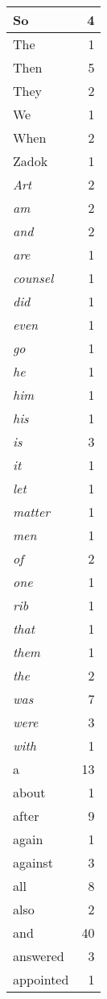 \begin{center}
\begin{longtable}{l|r}
So & 4 \\ \hline
The & 1 \\ \hline
Then & 5 \\ \hline
They & 2 \\ \hline
We & 1 \\ \hline
When & 2 \\ \hline
Zadok & 1 \\ \hline
\emph{Art} & 2 \\ \hline
\emph{am} & 2 \\ \hline
\emph{and} & 2 \\ \hline
\emph{are} & 1 \\ \hline
\emph{counsel} & 1 \\ \hline
\emph{did} & 1 \\ \hline
\emph{even} & 1 \\ \hline
\emph{go} & 1 \\ \hline
\emph{he} & 1 \\ \hline
\emph{him} & 1 \\ \hline
\emph{his} & 1 \\ \hline
\emph{is} & 3 \\ \hline
\emph{it} & 1 \\ \hline
\emph{let} & 1 \\ \hline
\emph{matter} & 1 \\ \hline
\emph{men} & 1 \\ \hline
\emph{of} & 2 \\ \hline
\emph{one} & 1 \\ \hline
\emph{rib} & 1 \\ \hline
\emph{that} & 1 \\ \hline
\emph{them} & 1 \\ \hline
\emph{the} & 2 \\ \hline
\emph{was} & 7 \\ \hline
\emph{were} & 3 \\ \hline
\emph{with} & 1 \\ \hline
a & 13 \\ \hline
about & 1 \\ \hline
after & 9 \\ \hline
again & 1 \\ \hline
against & 3 \\ \hline
all & 8 \\ \hline
also & 2 \\ \hline
and & 40 \\ \hline
answered & 3 \\ \hline
appointed & 1 \\ \hline

\end{longtable}
\end{center}
